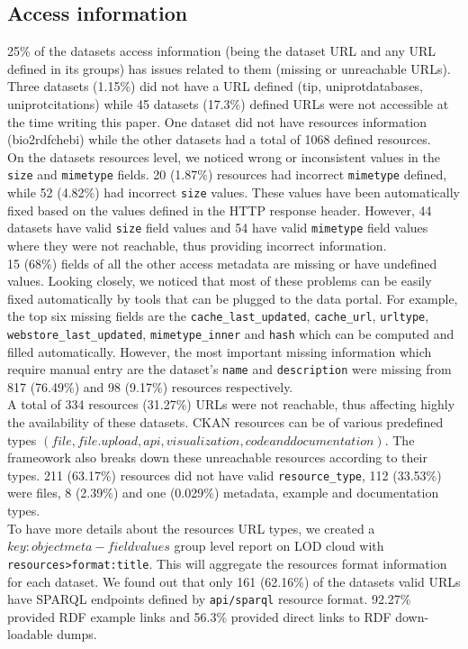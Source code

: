 \documentclass[runningheads,a4paper]{llncs}
\begin{document}
\subsection{Access information} 25\% of the datasets access information (being the dataset URL and any URL defined in its groups) has issues related to them (missing or unreachable URLs).
Three datasets (1.15\%) did not have a URL defined (tip, uniprot\-databases, uniprot\-citations) while 45 datasets (17.3\%) defined URLs were not accessible at the time writing this paper. One dataset did not have resources information (bio2rdf\-chebi) while the other datasets had a total of 1068 defined resources.\\
On the datasets resources level, we noticed wrong or inconsistent values in the \texttt{size} and \texttt{mimetype} fields. 20 (1.87\%) resources had incorrect \texttt{mimetype} defined, while 52 (4.82\%) had incorrect \texttt{size} values. These values have been automatically fixed based on the values defined in the HTTP response header. However, 44 datasets have valid \texttt{size} field values and 54 have valid \texttt{mimetype} field values where they were not reachable, thus providing incorrect information.\\
15 (68\%) fields of all the other access metadata are missing or have undefined values. Looking closely, we noticed that most of these problems can be easily fixed automatically by tools that can be plugged to the data portal. For example, the top six missing fields are the \texttt{cache\_last\_updated}, \texttt{cache\_url}, \texttt{url\-type}, \texttt{webstore\_last\_updated}, \texttt{mimetype\-\_inner} and \texttt{hash} which can be computed and filled automatically. However, the most important missing information which require manual entry are the dataset's \texttt{name} and \texttt{description} were missing from 817 (76.49\%) and 98 (9.17\%) resources respectively.\\
A total of 334 resources (31.27\%) URLs were not reachable, thus affecting highly the availability of these datasets. CKAN resources can be of various predefined types $(file, file.upload, api, visualization, code and documentation)$. The frameowork also breaks down these unreachable resources according to their types. 211 (63.17\%) resources did not have valid \texttt{resource\_type}, 112 (33.53\%) were files, 8 (2.39\%) and one (0.029\%) metadata, example and documentation types.\\

To have more details about the resources URL types, we created a $key:object meta-field values$ group level report on LOD cloud with \texttt{resources>format:title}. This will aggregate the resources format information for each dataset. We found out that only 161 (62.16\%) of the datasets valid URLs have SPARQL endpoints defined by \texttt{api/sparql} resource format. 92.27\% provided RDF example links and 56.3\% provided direct links to RDF down-loadable dumps.
\end{document}
